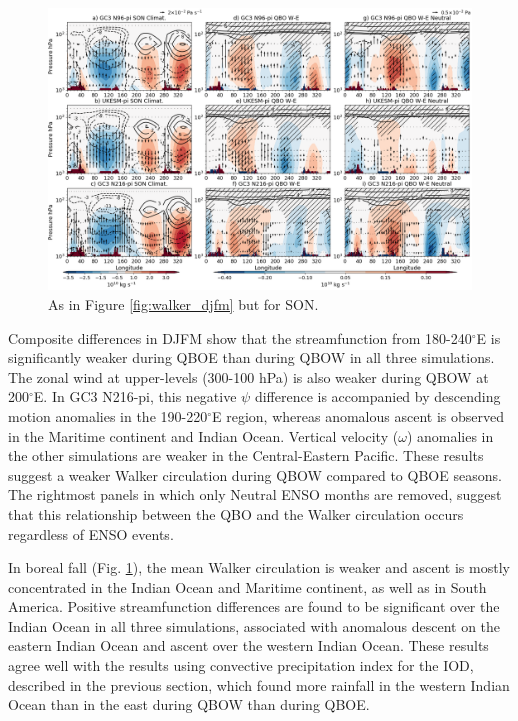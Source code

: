 \begin{figure}[t!]
\centering
 \noindent
 \includegraphics[width=\linewidth]{figures/cmip_streamson.png}
\caption[Walker circulation anomalies in SON]{As in Figure \ref{fig:walker_djfm} but for SON. }
\label{fig:walker_son}
\end{figure}

Composite differences in DJFM show that the streamfunction from 180-240$^\circ$E is significantly weaker during QBOE than during QBOW in all three simulations. The zonal wind at upper-levels (300-100 hPa) is also weaker during QBOW at 200$^\circ$E. In GC3 N216-pi, this negative $\psi$ difference is accompanied by descending motion anomalies in the 190-220$^\circ$E region, whereas anomalous ascent is observed in the Maritime continent and Indian Ocean. Vertical velocity ($\omega$) anomalies in the other simulations are weaker in the Central-Eastern Pacific. 
These results suggest a weaker Walker circulation during QBOW compared to QBOE seasons. 
The rightmost panels in which only Neutral ENSO months are removed, suggest that this relationship between the QBO and the Walker circulation occurs regardless of ENSO events.

In boreal fall (Fig. \ref{fig:walker_son}), the mean Walker circulation is weaker and ascent is mostly concentrated in the Indian Ocean and Maritime continent, as well as in South America. 
Positive streamfunction differences are found to be significant over the Indian Ocean in all three simulations, associated with anomalous descent on the eastern Indian Ocean and ascent over the western Indian Ocean. These results agree well with the results using convective precipitation index for the IOD, described in the previous section, which found more rainfall in the western Indian Ocean than in the east during QBOW than during QBOE. 

